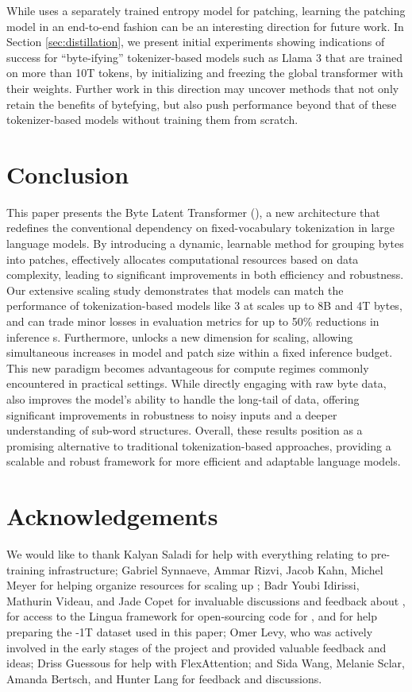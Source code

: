 \documentclass[]{fairmeta}
\begin{document}
While \model{} uses a separately trained entropy model for patching, learning the patching model in an end-to-end fashion can be an interesting direction for future work. In Section \ref{sec:distillation}, we present initial experiments showing indications of success for ``byte-ifying'' tokenizer-based models such as Llama 3 that are trained on more than 10T tokens, by initializing and freezing the global transformer with their weights. Further work in this direction may uncover methods that not only retain the benefits of bytefying, but also push performance beyond that of these tokenizer-based models without training them from scratch. 

\section{Conclusion}
\label{section:conclusion}

This paper presents the Byte Latent Transformer (\modelbf{}), a new architecture that redefines the conventional dependency on fixed-vocabulary tokenization in large language models. By introducing a dynamic, learnable method for grouping bytes into patches, \model{} effectively allocates computational resources based on data complexity, leading to significant improvements in both efficiency and robustness. Our extensive scaling study demonstrates that \model{} models can match the performance of tokenization-based models  like \llama{} 3 at scales up to 8B and 4T bytes, and can trade minor losses in evaluation metrics for up to 50\% reductions in inference \flop{}s. 
Furthermore, \model{} unlocks a new dimension for scaling, allowing simultaneous increases in model and patch size within a fixed inference budget. This new paradigm becomes advantageous for compute regimes commonly encountered in practical settings. 
While directly engaging with raw byte data, \model{} also improves the model's ability to handle the long-tail of data, offering significant improvements in robustness to noisy inputs and a deeper understanding of sub-word structures. 
Overall, these results position \model{} as a promising alternative to traditional tokenization-based approaches, providing a scalable and robust framework for more efficient and adaptable language models.

\section*{Acknowledgements}

We would like to thank Kalyan Saladi for help with everything relating to pre-training infrastructure; Gabriel Synnaeve, Ammar Rizvi, Jacob Kahn, Michel Meyer for helping organize resources for scaling up \model{}; Badr Youbi Idirissi, Mathurin Videau, and Jade Copet for invaluable discussions and feedback about \model{}, for access to the Lingua framework for open-sourcing code for \model{}, and for help preparing the \model{}-1T dataset used in this paper; Omer Levy, who was actively involved in the early stages of the project and provided valuable feedback and ideas; Driss Guessous for help with FlexAttention; and Sida Wang, Melanie Sclar, Amanda Bertsch, and Hunter Lang for feedback and discussions.
\end{document}
